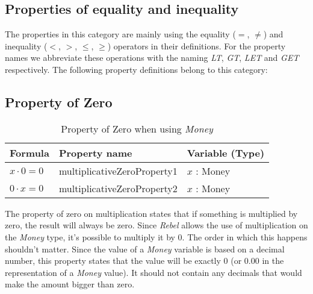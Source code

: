 \subsection{Properties of equality and inequality}
\label{ssct:properties_definitions_equalityproperties}
The properties in this category are mainly using the equality ($=$, $\neq$) and
inequality ($<$, $>$, $\leq$, $\geq$) operators in their definitions. For the
property names we abbreviate these operations with the naming \textit{LT},
\textit{GT}, \textit{LET} and \textit{GET} respectively. The following
property definitions belong to this category:

\subsection*{Property of Zero}
\label{ssct:properties_propertyofzero}
\begin{table}[!ht]
\centering
\begin{tabular}{lll}
\hline
                        \textbf{Formula}     & \textbf{Property name}      & \textbf{Variable (Type)} \\ \hline
\rowcolor[HTML]{EFEFEF} $x \cdot 0 = 0$ & multiplicativeZeroProperty1 & $x$ : Money              \\
                        $0 \cdot x = 0$ & multiplicativeZeroProperty2 & $x$ : Money              \\ \hline
\end{tabular}
\caption{Property of Zero when using \textit{Money}}
\label{tbl:ch4_money_propertyzero}
\end{table}
\FloatBarrier\noindent
The property of zero on multiplication states that if something is multiplied
by zero, the result will always be zero. Since \textit{Rebel} allows the use of
multiplication on the \textit{Money} type, it's possible to multiply it by 0.
The order in which this happens shouldn't matter. Since the value of a
\textit{Money} variable is based on a decimal number, this property states that
the value will be exactly 0 (or 0.00 in the representation of a \textit{Money}
value). It should not contain any decimals that would make the amount bigger
than zero.
\clearpage %
